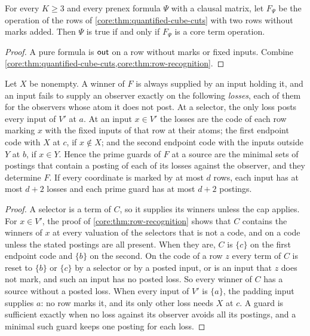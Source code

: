 \begin{corollary}
\label{core:thm:quantified-recognition}
For every $K\ge3$ and every prenex formula $\Psi$ with a clausal matrix,
let $F_\Psi$ be the operation of the rows of
\cref{core:thm:quantified-cube-cuts} with two rows without marks added.
Then $\Psi$ is true if and only if $F_\Psi$ is a core term operation.
\end{corollary}
\begin{proof}
A pure formula is $\mathsf{out}$ on a row without marks or fixed inputs. Combine
\cref{core:thm:quantified-cube-cuts,core:thm:row-recognition}.
\end{proof}

\begin{proposition}
\label{core:prop:row-losses}
Let $X$ be nonempty. A winner of $F$ is always supplied by an input
holding it, and an input fails to supply an observer exactly on the
following \emph{losses}, each of them for the observers whose atom it
does not post. At a selector, the only loss posts every input of $V'$ at
$a$. At an input $x\in V'$ the losses are the code of each row marking
$x$ with the fixed inputs of that row at their atoms; the first endpoint
code with $X$ at $c$, if $x\notin X$; and the second endpoint code with
the inputs outside $Y$ at $b$, if $x\in Y$. Hence the prime guards of $F$
at a source are the minimal sets of postings that contain a posting of
each of its losses against the observer, and they determine $F$. If every
coordinate is marked by at most $d$ rows, each input has at most $d+2$
losses and each prime guard has at most $d+2$ postings.
\end{proposition}
\begin{proof}
A selector is a term of $C$, so it supplies its winners unless the cap
applies. For $x\in V'$, the proof of \cref{core:thm:row-recognition}
shows that $C$ contains the winners of $x$ at every valuation of the
selectors that is not a code, and on a code unless the stated postings
are all present. When they are, $C$ is $\{c\}$ on the first endpoint code
and $\{b\}$ on the second. On the code of a row $z$ every term of $C$ is
reset to $\{b\}$ or $\{c\}$ by a selector or by a posted input, or is an
input that $z$ does not mark, and such an input has no posted loss. So
every winner of $C$ has a source without a posted loss. When every input
of $V'$ is $\{a\}$, the padding input supplies $a$: no row marks it, and
its only other loss needs $X$ at $c$. A guard is sufficient exactly when
no loss against its observer avoids all its postings, and a minimal such
guard keeps one posting for each loss.
\end{proof}

